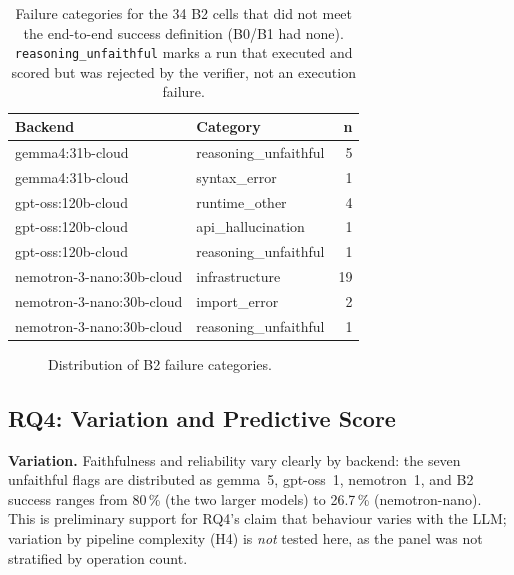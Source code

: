 \begin{table}[H]
\centering
\caption{Failure categories for the 34 B2 cells that did not meet the
end-to-end success definition (B0/B1 had none).
\texttt{reasoning\_unfaithful} marks a run that executed and scored but
was rejected by the verifier, not an execution failure.}
\label{tab:errors}
\small
\renewcommand{\arraystretch}{1.2}
\begin{tabular}{l l r}
\toprule
\textbf{Backend} & \textbf{Category} & \textbf{n} \\
\midrule
gemma4:31b-cloud          & reasoning\_unfaithful & 5 \\
gemma4:31b-cloud          & syntax\_error         & 1 \\
gpt-oss:120b-cloud        & runtime\_other        & 4 \\
gpt-oss:120b-cloud        & api\_hallucination    & 1 \\
gpt-oss:120b-cloud        & reasoning\_unfaithful & 1 \\
nemotron-3-nano:30b-cloud & infrastructure        & 19 \\
nemotron-3-nano:30b-cloud & import\_error         & 2 \\
nemotron-3-nano:30b-cloud & reasoning\_unfaithful & 1 \\
\bottomrule
\end{tabular}
\end{table}

\begin{figure}[H]
    \centering
    \caption{Distribution of B2 failure categories.}
    \label{fig:errtax}
\end{figure}

\subsection{RQ4: Variation and Predictive Score}
\label{sec:rq4}

\textbf{Variation.} Faithfulness and reliability vary clearly by
backend: the seven unfaithful flags are distributed as gemma~5,
gpt-oss~1, nemotron~1, and B2 success ranges from 80\,\% (the two
larger models) to 26.7\,\% (nemotron-nano). This is preliminary
support for RQ4's claim that behaviour varies with the LLM; variation
by pipeline complexity (H4) is \emph{not} tested here, as the panel
was not stratified by operation count.

